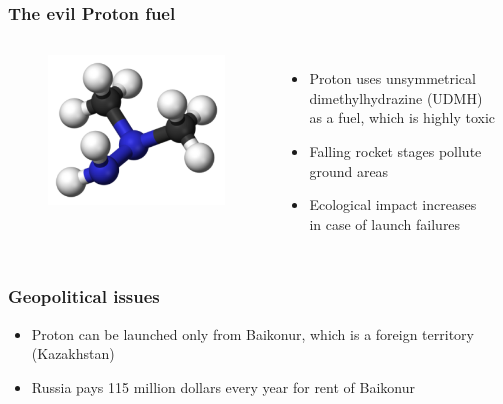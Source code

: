 \documentclass[onlymath]{beamer}
\newcommand\tw\textwidth
\begin{document}
\begin{frame}
  \frametitle{The evil Proton fuel}
  \begin{columns}
    \column{.45\tw}
    \begin{figure}
      \centering
      \includegraphics[scale=0.5]{UDMH.png}
    \end{figure}
    \column{.55\tw}
    \begin{itemize}
    \item Proton uses unsymmetrical dimethylhydrazine (UDMH) \\as a
      fuel, which is highly toxic
    \item Falling rocket stages pollute ground areas
    \item Ecological impact increases \\in case of launch failures
    \end{itemize}
  \end{columns}

\end{frame}

\begin{frame}
  \frametitle{Geopolitical issues}

  \begin{itemize}
  \item Proton can be launched only from Baikonur, which is a foreign
    territory (Kazakhstan)
  \item Russia pays 115 million dollars every year for rent of
    Baikonur
  \end{itemize}
\end{frame}
\end{document}
